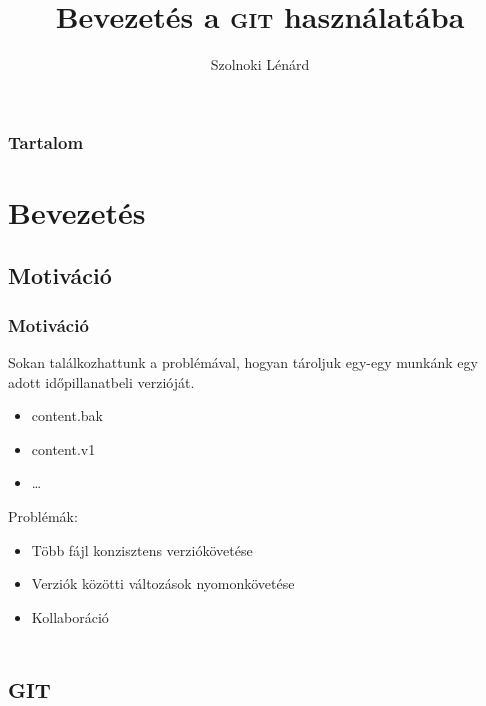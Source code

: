 

\newcommand{\git}{\textsc{git} }

\title{Bevezetés a \git használatába}
\author[Szolnoki Lénárd]{Szolnoki Lénárd}




\begin{frame}
 \titlepage
\end{frame}

\begin{frame}[noframenumbering]
 \frametitle{Tartalom}
 \tableofcontents
\end{frame}

\section{Bevezetés}
	\subsection{Motiváció}
	\begin{frame}
	  \frametitle{Motiváció}
	  Sokan találkozhattunk a problémával, hogyan tároljuk egy-egy munkánk egy adott időpillanatbeli verzióját.
	  \begin{itemize}
	    \item{content.bak}
	    \item{content.v1}
	    \item{\dots}
	  \end{itemize}
	  
	  Problémák:
	  \begin{itemize}
	    \item{Több fájl konzisztens verziókövetése}
	    \item{Verziók közötti változások nyomonkövetése}
	    \item{Kollaboráció}
	  \end{itemize}
	\end{frame}

\section{\git}
